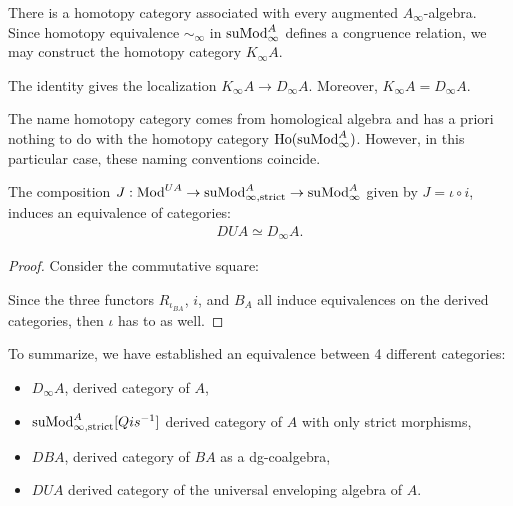 \documentclass[../thesis.tex]{subfiles}
\begin{document}
            There is a homotopy category associated with every augmented $A_\infty$-algebra. Since homotopy equivalence $\sim_\infty$ in $\tt{suMod}_\infty^A$ defines a congruence relation, we may construct the homotopy category $K_\infty A$.

            \begin{corollary}
                The identity gives the localization $K_\infty A \to D_\infty A$. Moreover, $K_\infty A = D_\infty A$.
            \end{corollary}

            \begin{remark}
                The name homotopy category comes from homological algebra and has a priori nothing to do with the homotopy category $\tt{Ho}(\tt{suMod}_\infty^A)$. However, in this particular case, these naming conventions coincide.
            \end{remark}

            \begin{lemma}\label{lem: universal-enveloping-is-derived}
                The composition $J : \tt{Mod}^{UA} \to \tt{suMod}_{\infty, \tt{strict}}^A \to \tt{suMod}_\infty^A$ given by $J = \iota \circ i$, induces an equivalence of categories:
                \begin{align*}
                    DUA \simeq D_\infty A.
                \end{align*}
            \end{lemma}

            \begin{proof}
                Consider the commutative square:
                \begin{center}
                \end{center}

                Since the three functors $R_{\iota_{BA}}$, $i$, and $B_A$ all induce equivalences on the derived categories, then $\iota$ has to as well.
            \end{proof}

            To summarize, we have established an equivalence between 4 different categories:
            \begin{itemize}
                \item $D_\infty A$, derived category of $A$,
                \item $\tt{suMod}_{\infty, \tt{strict}}^A[Qis^{-1}]$ derived category of $A$ with only strict morphisms,
                \item $DBA$, derived category of $BA$ as a dg-coalgebra,
                \item $DUA$ derived category of the universal enveloping algebra of $A$.
            \end{itemize}
\end{document}
